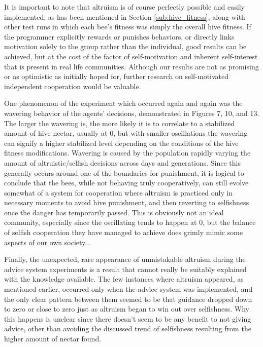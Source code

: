 \documentclass[twoside]{article}
\begin{document}
\begin{multicols}{2}
		It is important to note that altruism is of course perfectly possible and easily implemented, as has been mentioned in Section \ref{sub:hive_fitness}, along with other test runs in which each bee's fitness was simply the overall hive fitness. If the programmer explicitly rewards or punishes behaviors, or directly links motivation solely to the group rather than the individual, good results can be achieved, but at the cost of the factor of self-motivation and inherent self-interest that is present in real life communities. Although our results are not as promising or as optimistic as initially hoped for, further research on self-motivated independent cooperation would be valuable. 

        One phenomenon of the experiment which occurred again and again was the wavering behavior of the agents' decisions, demonstrated in Figures 7, 10, and 13. The larger the wavering is, the more likely it is to correlate to a stabilized amount of hive nectar, usually at 0, but with smaller oscillations the wavering can signify a higher stabilized level depending on the conditions of the hive fitness modifications. Wavering is caused by the population rapidly varying the amount of altruistic/selfish decisions across days and generations. Since this generally occurs around one of the boundaries for punishment, it is logical to conclude that the bees, while not behaving truly cooperatively, can still evolve somewhat of a system for cooperation where altruism is practiced only in necessary moments to avoid hive punishment, and then reverting to selfishness once the danger has temporarily passed. This is obviously not an ideal community, especially since the oscillating tends to happen at 0, but the balance of selfish cooperation they have managed to achieve does grimly mimic some aspects of our own society...

        Finally, the unexpected, rare appearance of unmistakable altruism during the advice system experiments is a result that cannot really be suitably explained with the knowledge available. The few instances where altruism appeared, as mentioned earlier, occurred only when the advice system was implemented, and the only clear pattern between them seemed to be that guidance dropped down to zero or close to zero just as altruism began to win out over selfishness. Why this happens is unclear since there doesn't seem to be any benefit to not giving advice, other than avoiding the discussed trend of selfishness resulting from the higher amount of nectar found.


	\nocite{*}
	
	
\end{multicols}
\end{document}
